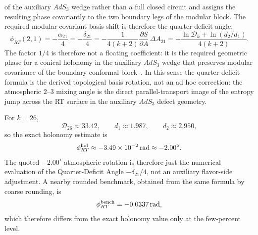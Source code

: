 \documentclass[11pt]{article}
\newcommand{\cD}{\mathcal{D}}
\begin{document}
of the auxiliary $AdS_3$ wedge rather than a full closed circuit and assigns the
resulting phase covariantly to the two boundary legs of the modular block. The
required modular-covariant basis shift is therefore the quarter-deficit angle,
\begin{equation}
 \phi_{RT}(2,1)
 = -\frac{\alpha_{21}}{4}
 = -\frac{\delta_{21}}{4}
 = -\frac{1}{4(k+2)}\frac{\partial S}{\partial A}\,\Delta A_{21}
 = -\frac{\ln \cD_k + \ln(d_2/d_1)}{4(k+2)}.
\end{equation}
The factor $1/4$ is therefore not a floating coefficient: it is the required
geometric phase for a conical holonomy in the auxiliary $AdS_3$ wedge that
preserves modular covariance of the boundary conformal block~\cite{friedan1987,witten1989}. In this sense the
quarter-deficit formula is the derived topological basis rotation, not an ad hoc correction: the atmospheric $2$--$3$ mixing angle
is the direct parallel-transport image of the entropy jump across the RT
surface in the auxiliary $AdS_3$ defect geometry.

For $k=26$,
\begin{equation}
 \cD_{26}\approx33.42,
 \qquad
 d_1\approx1.987,
 \qquad
 d_2\approx2.950,
\end{equation}
so the exact holonomy estimate is
\begin{equation}
 \phi_{RT}^{\rm hol}\approx -3.49\times10^{-2}\,\mathrm{rad}\approx -2.00^{\circ}.
\end{equation}
The quoted $-2.00^{\circ}$ atmospheric rotation is therefore just the numerical evaluation of the Quarter-Deficit Angle $-\delta_{21}/4$, not an auxiliary flavor-side adjustment.
A nearby rounded benchmark, obtained from the same formula by coarse rounding, is
\begin{equation}
 \phi_{RT}^{\rm bench}=-0.0337\,\mathrm{rad},
\end{equation}
which therefore differs from the exact holonomy value only at the few-percent level.
\end{document}
